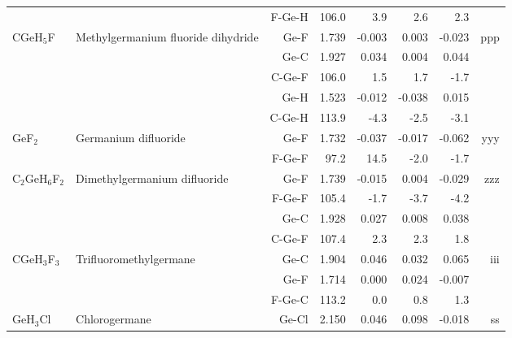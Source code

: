 \begin{table}
\begin{center}
\begin{tabular}{llrrrrrr}
             &                                    &F-Ge-H       &     106.0   &       3.9 &       2.6 &       2.3   &       \\
 CGeH$_5$F      & Methylgermanium fluoride dihydride &Ge-F           &     1.739   &    -0.003 &     0.003 &    -0.023 &   ppp \\
             &                                    &Ge-C           &     1.927   &     0.034 &     0.004 &     0.044 &       \\
             &                                    &C-Ge-F       &     106.0   &       1.5 &       1.7 &      -1.7   &       \\
             &                                    &Ge-H           &     1.523   &    -0.012 &    -0.038 &     0.015 &       \\
             &                                    &C-Ge-H       &     113.9   &      -4.3 &      -2.5 &      -3.1   &       \\
 GeF$_2$        & Germanium difluoride               &Ge-F           &     1.732   &    -0.037 &    -0.017 &    -0.062 &   yyy \\
             &                                    &F-Ge-F       &      97.2   &      14.5 &      -2.0 &      -1.7   &       \\
 C$_2$GeH$_6$F$_2$    & Dimethylgermanium difluoride       &Ge-F           &     1.739   &    -0.015 &     0.004 &    -0.029 &   zzz \\
             &                                    &F-Ge-F       &     105.4   &      -1.7 &      -3.7 &      -4.2   &       \\
             &                                    &Ge-C           &     1.928   &     0.027 &     0.008 &     0.038 &       \\
             &                                    &C-Ge-F       &     107.4   &       2.3 &       2.3 &       1.8   &       \\
 CGeH$_3$F$_3$     & Trifluoromethylgermane             &Ge-C           &     1.904   &     0.046 &     0.032 &     0.065 &   iii \\
             &                                    &Ge-F           &     1.714   &     0.000 &     0.024 &    -0.007 &       \\
             &                                    &F-Ge-C       &     113.2   &       0.0 &       0.8 &       1.3   &       \\
 GeH$_3$Cl      & Chlorogermane                      &Ge-Cl          &     2.150   &     0.046 &     0.098 &    -0.018 &    ss \\

\end{tabular}
\end{center}
\end{table}

